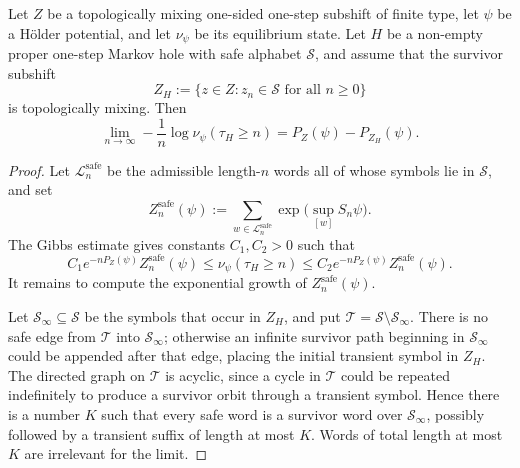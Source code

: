 \begin{lemma}
\label{lem:holder-safe-word-pressure}
Let \(Z\) be a topologically mixing one-sided one-step subshift of finite
type, let \(\psi\) be a H\"older potential, and let \(\nu_\psi\) be its
equilibrium state.  Let \(H\) be a non-empty proper one-step Markov hole
with safe alphabet \(\mathcal S\), and assume that the survivor subshift
\[
  Z_H:=\{z\in Z:z_n\in\mathcal S\text{ for all }n\geq0\}
\]
is topologically mixing.  Then
\[
  \lim_{n\to\infty}
  -\frac1n\log \nu_\psi(\tau_H\geq n)
  =
  P_Z(\psi)-P_{Z_H}(\psi).
\]
\end{lemma}

\begin{proof}
Let \(\mathcal L_n^{\mathrm{safe}}\) be the admissible length-\(n\)
words all of whose symbols lie in \(\mathcal S\), and set
\[
  Z_n^{\mathrm{safe}}(\psi)
  :=
  \sum_{w\in\mathcal L_n^{\mathrm{safe}}}
    \exp\bigl(\sup_{[w]}S_n\psi\bigr).
\]
The Gibbs estimate gives constants \(C_1,C_2>0\) such that
\[
  C_1e^{-nP_Z(\psi)}Z_n^{\mathrm{safe}}(\psi)
  \leq
  \nu_\psi(\tau_H\geq n)
  \leq
  C_2e^{-nP_Z(\psi)}Z_n^{\mathrm{safe}}(\psi).
\]
It remains to compute the exponential growth of
\(Z_n^{\mathrm{safe}}(\psi)\).

Let \(\mathcal S_\infty\subseteq\mathcal S\) be the symbols that occur
in \(Z_H\), and put \(\mathcal T=\mathcal S\setminus\mathcal S_\infty\).
There is no safe edge from \(\mathcal T\) into \(\mathcal S_\infty\);
otherwise an infinite survivor path beginning in \(\mathcal S_\infty\)
could be appended after that edge, placing the initial transient symbol
in \(Z_H\).  The directed graph on \(\mathcal T\) is acyclic, since a
cycle in \(\mathcal T\) could be repeated indefinitely to produce a
survivor orbit through a transient symbol.  Hence there is a number
\(K\) such that every safe word is a survivor word over
\(\mathcal S_\infty\), possibly followed by a transient suffix of length
at most \(K\).  Words of total length at most \(K\) are irrelevant for
the limit.


\end{proof}
